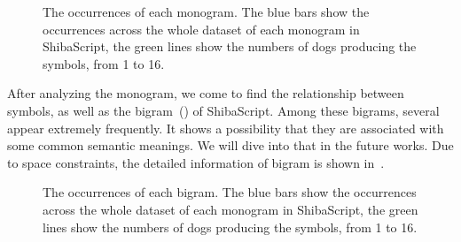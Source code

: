 \begin{figure}[th]
\centering
{}
\caption{The occurrences of each monogram. The blue bars show the occurrences across the whole dataset of each monogram in ShibaScript, the green lines show the numbers of dogs producing the symbols, from 1 to 16.}%
\label{fig:monogram}
\end{figure}

After analyzing the monogram, we come to find the relationship between symbols, as well as the bigram~() of ShibaScript. Among these bigrams, several appear extremely frequently. It shows a possibility that they are associated with some common semantic meanings. We will dive into that in the future works. Due to space constraints, the detailed information of bigram is shown in~.

\begin{figure}[th]
\centering
{}
\caption{The occurrences of each bigram. The blue bars show the occurrences across the whole dataset of each monogram in ShibaScript, the green lines show the numbers of dogs producing the symbols, from 1 to 16.}
\label{fig:bigram}
\end{figure}




